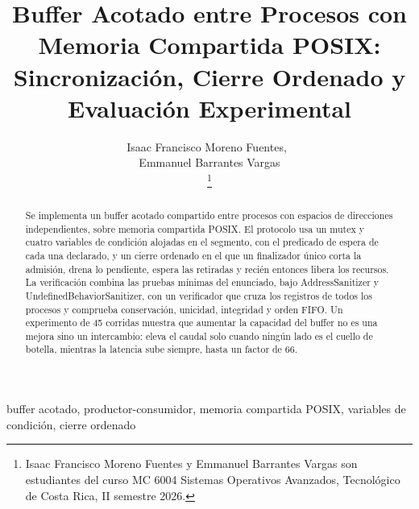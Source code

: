\documentclass[journal]{IEEEtran}
\title{\LARGE Buffer Acotado entre Procesos con Memoria Compartida POSIX:\\
Sincronización, Cierre Ordenado y Evaluación Experimental}
\author{
    Isaac Francisco Moreno Fuentes,~\\
    Emmanuel Barrantes Vargas\\
    \thanks{Isaac Francisco Moreno Fuentes y Emmanuel Barrantes Vargas son estudiantes del curso MC 6004 Sistemas Operativos Avanzados, Tecnológico de Costa Rica, II semestre 2026.}
}
\begin{document}
\maketitle

\begin{abstract}
Se implementa un buffer acotado compartido entre procesos con espacios de
direcciones independientes, sobre memoria compartida POSIX. El protocolo usa
un mutex y cuatro variables de condición alojadas en el segmento, con el
predicado de espera de cada una declarado, y un cierre ordenado en el que un
finalizador único corta la admisión, drena lo pendiente, espera las retiradas
y recién entonces libera los recursos. La verificación combina las pruebas
mínimas del enunciado, bajo AddressSanitizer y UndefinedBehaviorSanitizer,
con un verificador que cruza los registros de todos los procesos y comprueba
conservación, unicidad, integridad y orden FIFO. Un experimento de 45
corridas muestra que aumentar la capacidad del buffer no es una mejora sino
un intercambio: eleva el caudal solo cuando ningún lado es el cuello de
botella, mientras la latencia sube siempre, hasta un factor de 66.
\end{abstract}

\begin{IEEEkeywords}
buffer acotado, productor-consumidor, memoria compartida POSIX,
variables de condición, cierre ordenado
\end{IEEEkeywords}














\end{document}
